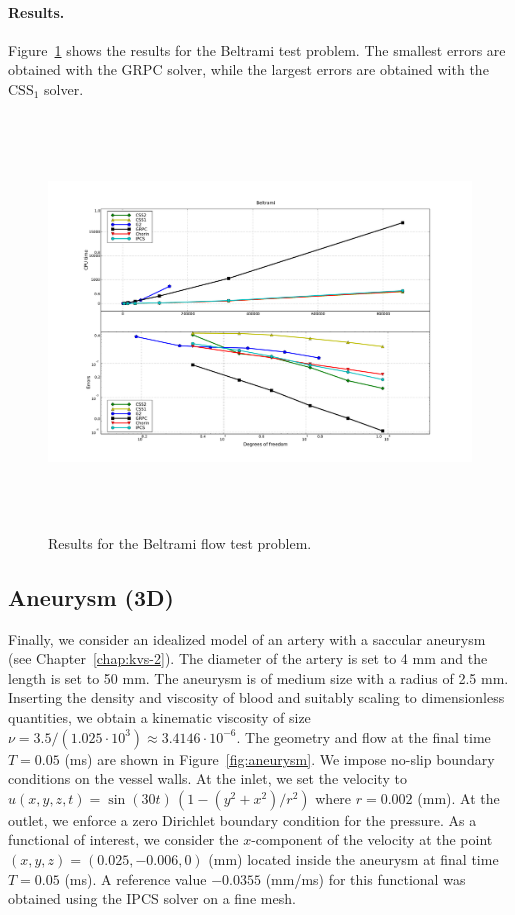 \paragraph{Results.}

Figure~\ref{fig:beltrami_res} shows the results for the Beltrami test
problem. The smallest errors are obtained with the GRPC solver, while
the largest errors are obtained with the $\mathrm{CSS}_1$ solver.

\begin{figure}
  \hspace{-2cm}
  \includegraphics[width=20cm,height=11cm,keepaspectratio=false]{chapters/kvs-1/pdf/new_beltrami_res.pdf}
  \caption{Results for the Beltrami flow test problem.}
  \label{fig:beltrami_res}
\end{figure}

\subsection{Aneurysm (3D)}

Finally, we consider an idealized model of an artery with a saccular
aneurysm (see Chapter~\ref{chap:kvs-2}). The diameter of the artery is
set to 4 mm and the length is set to 50 mm. The aneurysm is of medium
size with a radius of 2.5 mm. Inserting the density and viscosity of
blood and suitably scaling to dimensionless quantities, we obtain a
kinematic viscosity of size $\nu = 3.5 / (1.025 \cdot 10^3) \approx
3.4146 \cdot 10^{-6}$. The geometry and flow at the final time $T =
0.05$ (ms) are shown in Figure~\ref{fig:aneurysm}. We impose no-slip
boundary conditions on the vessel walls. At the inlet, we set the
velocity to $u(x, y, z, t) = \sin(30 t) \, (1 - (y^2 + x^2) / r^2)$
where $r = 0.002$ (mm). At the outlet, we enforce a zero Dirichlet
boundary condition for the pressure. As a functional of interest, we
consider the $x$-component of the velocity at the point $(x, y, z) =
(0.025, -0.006, 0)$ (mm) located inside the aneurysm at final time $T
= 0.05$ (ms). A reference value $-0.0355$ (mm/ms) for this functional
was obtained using the IPCS solver on a fine mesh.


